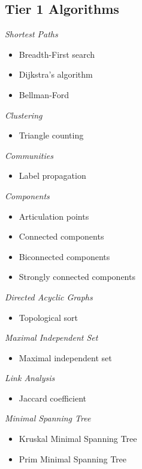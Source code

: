 \subsection{Tier 1 Algorithms}
\begin{multicols}{3}
      \emph{Shortest Paths}
      \begin{itemize}
            \item Breadth-First search
            \item Dijkstra's algorithm
            \item Bellman-Ford
      \end{itemize}
      \emph{Clustering}
      \begin{itemize}
            \item Triangle counting
      \end{itemize}
      \emph{Communities}
      \begin{itemize}
            \item Label propagation
      \end{itemize}
\columnbreak
      \emph{Components}
      \begin{itemize}
            \item Articulation points
            \item Connected components
            \item Biconnected components
            \item Strongly connected components  
      \end{itemize}
      \emph{Directed Acyclic Graphs}
      \begin{itemize}
            \item Topological sort
      \end{itemize}
\columnbreak
      \emph{Maximal Independent Set}
      \begin{itemize}
            \item Maximal independent set
      \end{itemize}
      \emph{Link Analysis}
      \begin{itemize}
            \item Jaccard coefficient
      \end{itemize}
      \emph{Minimal Spanning Tree}
      \begin{itemize}
            \item Kruskal Minimal Spanning Tree
            \item Prim Minimal Spanning Tree
      \end{itemize}

\vfill\null
\end{multicols}


